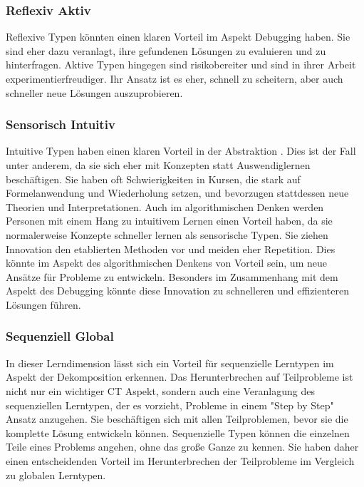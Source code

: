 \subsubsection{Reflexiv Aktiv}
Reflexive Typen könnten einen klaren Vorteil im Aspekt Debugging haben. Sie sind eher dazu veranlagt, ihre gefundenen Lösungen zu evaluieren und zu hinterfragen. Aktive Typen hingegen sind risikobereiter und sind in ihrer Arbeit experimentierfreudiger. Ihr Ansatz ist es eher, schnell zu scheitern, aber auch schneller neue Lösungen auszuprobieren.

\subsubsection{Sensorisch Intuitiv}
Intuitive Typen haben einen klaren Vorteil in der Abstraktion \cite{felderhandout}. Dies ist der Fall unter anderem, da sie sich eher mit Konzepten statt Auswendiglernen beschäftigen. Sie haben oft Schwierigkeiten in Kursen, die stark auf Formelanwendung und Wiederholung setzen, und bevorzugen stattdessen neue Theorien und Interpretationen.
Auch im algorithmischen Denken werden Personen mit einem Hang zu intuitivem Lernen einen Vorteil haben, da sie normalerweise Konzepte schneller lernen als sensorische Typen. Sie ziehen Innovation den etablierten Methoden vor und meiden eher Repetition. Dies könnte im Aspekt des algorithmischen Denkens von Vorteil sein, um neue Ansätze für Probleme zu entwickeln. Besonders im Zusammenhang mit dem Aspekt des Debugging könnte diese Innovation zu schnelleren und effizienteren Lösungen führen.

\subsubsection{Sequenziell Global}
In dieser Lerndimension lässt sich ein Vorteil für sequenzielle Lerntypen im Aspekt der Dekomposition erkennen. Das Herunterbrechen auf Teilprobleme ist nicht nur ein wichtiger CT Aspekt, sondern auch eine Veranlagung des sequenziellen Lerntypen, der es vorzieht, Probleme in einem "Step by Step" Ansatz anzugehen. Sie beschäftigen sich mit allen Teilproblemen, bevor sie die komplette Lösung entwickeln können. Sequenzielle Typen können die einzelnen Teile eines Problems angehen, ohne das große Ganze zu kennen. Sie haben daher einen entscheidenden Vorteil im Herunterbrechen der Teilprobleme im Vergleich zu globalen Lerntypen.

